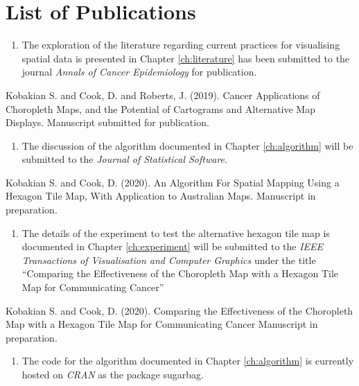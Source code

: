 \documentclass{monashthesis}
\begin{document}
\hypertarget{list-of-publications}{%
\chapter*{List of Publications}\label{list-of-publications}}

\begin{enumerate}
\def\labelenumi{\arabic{enumi}.}
\tightlist
\item
  The exploration of the literature regarding current practices for visualising spatial data is presented in Chapter \ref{ch:literature} has been submitted to the journal \emph{Annals of Cancer Epidemiology} for publication.
\end{enumerate}

Kobakian S. and Cook, D. and Roberts, J. (2019). Cancer Applications of Choropleth Maps, and the Potential of Cartograms and Alternative Map Displays. Manuscript submitted for publication.

\begin{enumerate}
\def\labelenumi{\arabic{enumi}.}
\setcounter{enumi}{1}
\tightlist
\item
  The discussion of the algorithm documented in Chapter \ref{ch:algorithm} will be submitted to the \emph{Journal of Statistical Software}.
\end{enumerate}

Kobakian S. and Cook, D. (2020). An Algorithm For Spatial Mapping Using a Hexagon Tile Map, With Application to Australian Maps. Manuscript in preparation.

\begin{enumerate}
\def\labelenumi{\arabic{enumi}.}
\setcounter{enumi}{2}
\tightlist
\item
  The details of the experiment to test the alternative hexagon tile map is documented in Chapter \ref{ch:experiment} will be submitted to the \emph{IEEE Transactions of Visualisation and Computer Graphics} under the title ``Comparing the Effectiveness of the Choropleth Map with a Hexagon Tile Map for Communicating Cancer''
\end{enumerate}

Kobakian S. and Cook, D. (2020). Comparing the Effectiveness of the Choropleth Map with a Hexagon Tile Map for Communicating Cancer Manuscript in preparation.

\begin{enumerate}
\def\labelenumi{\arabic{enumi}.}
\setcounter{enumi}{3}
\tightlist
\item
  The code for the algorithm documented in Chapter \ref{ch:algorithm} is currently hosted on \emph{CRAN} as the package sugarbag.
\end{enumerate}
\end{document}
